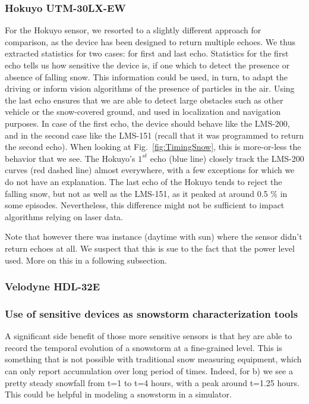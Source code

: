 \subsubsection{Hokuyo UTM-30LX-EW}
For the Hokuyo sensor, we resorted to a slightly different approach for comparison, as the device has been designed to return multiple echoes. We thus extracted statistics for two cases: for first and last echo. Statistics for the first echo tells us how sensitive the device is, if one which to detect the presence or absence of falling snow. This information could be used, in turn, to adapt the driving or inform vision algorithms of the presence of particles in the air. Using the last echo ensures that we are able to detect large obstacles such as other vehicle or the snow-covered ground, and used in localization and navigation purposes. In case of the first echo, the device should behave like the LMS-200, and in the second case like the LMS-151 (recall that it was programmed to return the second echo). When looking at Fig.~\ref{fig:TimingSnow}, this is more-or-less the behavior that we see. The Hokuyo's $1^{st}$ echo (blue line) closely track the LMS-200 curves (red dashed line) almost everywhere, with a few exceptions for which we do not have an explanation. The last echo of the Hokuyo tends to reject the falling snow, but not as well as the LMS-151, as it peaked at around 0.5 \% in some episodes. Nevertheless, this difference might not be sufficient to impact algorithms relying on laser data.

Note that however there was instance (daytime with sun) where the sensor didn't return echoes at all. We suspect that this is sue to the fact that the power level used. More on this in a following subsection.


\subsubsection{Velodyne HDL-32E}

\subsubsection{Use of sensitive devices as snowstorm characterization tools}
A significant side benefit of those more sensitive sensors is that hey are able to record the temporal evolution of a snowstorm at a fine-grained level. This is something that is not possible with traditional snow measuring equipment, which can only report accumulation over long period of times. Indeed, for b) we see a pretty steady snowfall from t=1 to t=4 hours, with a peak around t=1.25 hours. This could be helpful in modeling a snowstorm in a simulator.

